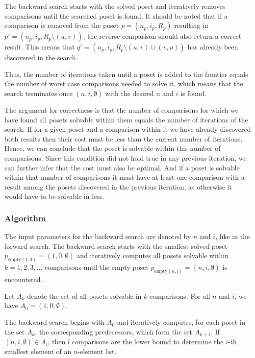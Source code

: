 \documentclass[10pt,journal,compsoc]{IEEEtran}
\begin{document}
The backward search starts with the solved poset and iteratively removes comparisons until the searched poset is found.
It should be noted that if a comparison is removed from the poset $p = (n_p, i_p, R_p)$ resulting in $p' = (n_p, i_p, R_p \setminus (u, v))$, the reverse comparison should also return a correct result.
This means that $q' = (n_p, i_p, R_p \setminus (u, v) \cup (v, u))$ has already been discovered in the search.

Thus, the number of iterations taken until a poset is added to the frontier equals the number of worst case comparisons needed to solve it, which means that the search terminates once $(n, i, \emptyset)$ with the desired $n$ and $i$ is found.

The argument for correctness is that the number of comparisons for which we have found all posets solvable within them equals the number of iterations of the search.
If for a given poset and a comparison within it we have already discovered both results then their cost must be less than the current number of iterations.
Hence, we can conclude that the poset is solvable within this number of comparisons.
Since this condition did not hold true in any previous iteration, we can further infer that the cost must also be optimal.
And if a poset is solvable within that number of comparisons it must have at least one comparison with a result among the posets discovered in the previous iteration, as otherwise it would have to be solvable in less.


\subsubsection{Algorithm} \label{sec:backward:algorithm}
The input parameters for the backward search are denoted by $n$ and $i$, like in the forward search.
The backward search starts with the smallest solved poset $p_{\text{empty} (1, 0)} = (1, 0, \emptyset)$ and iteratively computes all posets solvable within $k = 1, 2, 3, \dots$ comparisons until the empty poset $p_{\text{empty} (n, i)} = (n, i, \emptyset)$ is encountered.

Let $A_k$ denote the set of all posets solvable in $k$ comparisons.
For all $n$ and $i$, we have $A_0 = { (1, 0, \emptyset) }$.

The backward search begins with $A_0$ and iteratively computes, for each poset in the set $A_k$, the corresponding predecessors, which form the set $A_{k + 1}$.
If $(n, i, \emptyset) \in A_l$, then $l$ comparisons are the lower bound to determine the $i$-th smallest element of an $n$-element list.
\end{document}
